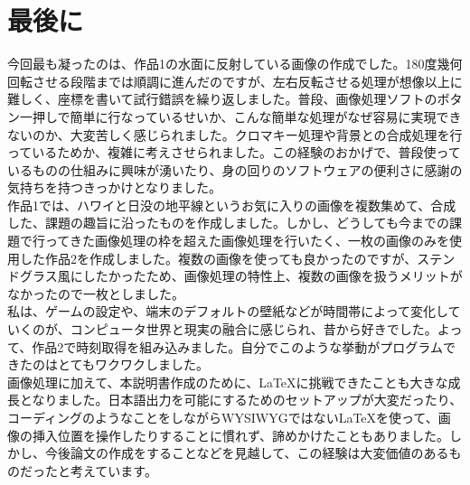 \documentclass{jsarticle}
\begin{document}
\section{最後に}
今回最も凝ったのは、作品1の水面に反射している画像の作成でした。180度幾何回転させる段階までは順調に進んだのですが、左右反転させる処理が想像以上に難しく、座標を書いて試行錯誤を繰り返しました。普段、画像処理ソフトのボタン一押しで簡単に行なっているせいか、こんな簡単な処理がなぜ容易に実現できないのか、大変苦しく感じられました。クロマキー処理や背景との合成処理を行っているためか、複雑に考えさせられました。この経験のおかげで、普段使っているものの仕組みに興味が湧いたり、身の回りのソフトウェアの便利さに感謝の気持ちを持つきっかけとなりました。\\
\hspace{3mm}作品1では、ハワイと日没の地平線というお気に入りの画像を複数集めて、合成した、課題の趣旨に沿ったものを作成しました。しかし、どうしても今までの課題で行ってきた画像処理の枠を超えた画像処理を行いたく、一枚の画像のみを使用した作品2を作成しました。複数の画像を使っても良かったのですが、ステンドグラス風にしたかったため、画像処理の特性上、複数の画像を扱うメリットがなかったので一枚としました。\\
私は、ゲームの設定や、端末のデフォルトの壁紙などが時間帯によって変化していくのが、コンピュータ世界と現実の融合に感じられ、昔から好きでした。よって、作品2で時刻取得を組み込みました。自分でこのような挙動がプログラムできたのはとてもワクワクしました。\\
\hspace{3mm}画像処理に加えて、本説明書作成のために、LaTeXに挑戦できたことも大きな成長となりました。日本語出力を可能にするためのセットアップが大変だったり、コーディングのようなことをしながらWYSIWYGではないLaTeXを使って、画像の挿入位置を操作したりすることに慣れず、諦めかけたこともありました。しかし、今後論文の作成をすることなどを見越して、この経験は大変価値のあるものだったと考えています。
\end{document}
